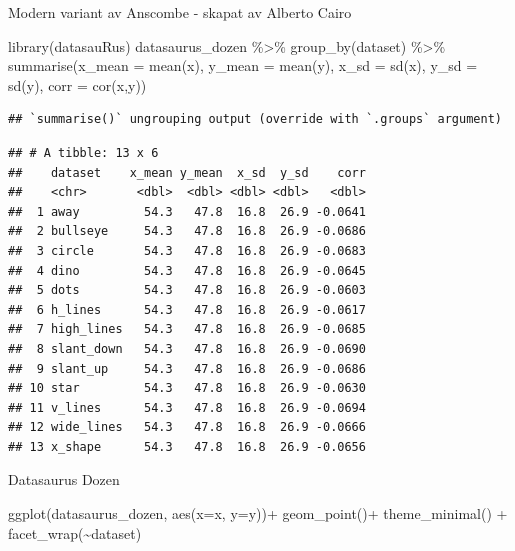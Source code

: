 \documentclass[
]{book}
\newenvironment{Shaded}{\begin{snugshade}}{\end{snugshade}}
\newcommand{\AttributeTok}[1]{\textcolor[rgb]{0.77,0.63,0.00}{#1}}
\newcommand{\FunctionTok}[1]{\textcolor[rgb]{0.00,0.00,0.00}{#1}}
\newcommand{\NormalTok}[1]{#1}
\newcommand{\SpecialCharTok}[1]{\textcolor[rgb]{0.00,0.00,0.00}{#1}}
\begin{document}
Modern variant av Anscombe - skapat av Alberto Cairo

\begin{Shaded}
\begin{Highlighting}[]
\FunctionTok{library}\NormalTok{(datasauRus)}
\NormalTok{datasaurus\_dozen }\SpecialCharTok{\%\textgreater{}\%} 
  \FunctionTok{group\_by}\NormalTok{(dataset) }\SpecialCharTok{\%\textgreater{}\%}
  \FunctionTok{summarise}\NormalTok{(}\AttributeTok{x\_mean =} \FunctionTok{mean}\NormalTok{(x), }\AttributeTok{y\_mean =} \FunctionTok{mean}\NormalTok{(y), }
            \AttributeTok{x\_sd =} \FunctionTok{sd}\NormalTok{(x), }\AttributeTok{y\_sd =} \FunctionTok{sd}\NormalTok{(y),}
            \AttributeTok{corr =} \FunctionTok{cor}\NormalTok{(x,y)) }
\end{Highlighting}
\end{Shaded}

\begin{verbatim}
## `summarise()` ungrouping output (override with `.groups` argument)
\end{verbatim}

\begin{verbatim}
## # A tibble: 13 x 6
##    dataset    x_mean y_mean  x_sd  y_sd    corr
##    <chr>       <dbl>  <dbl> <dbl> <dbl>   <dbl>
##  1 away         54.3   47.8  16.8  26.9 -0.0641
##  2 bullseye     54.3   47.8  16.8  26.9 -0.0686
##  3 circle       54.3   47.8  16.8  26.9 -0.0683
##  4 dino         54.3   47.8  16.8  26.9 -0.0645
##  5 dots         54.3   47.8  16.8  26.9 -0.0603
##  6 h_lines      54.3   47.8  16.8  26.9 -0.0617
##  7 high_lines   54.3   47.8  16.8  26.9 -0.0685
##  8 slant_down   54.3   47.8  16.8  26.9 -0.0690
##  9 slant_up     54.3   47.8  16.8  26.9 -0.0686
## 10 star         54.3   47.8  16.8  26.9 -0.0630
## 11 v_lines      54.3   47.8  16.8  26.9 -0.0694
## 12 wide_lines   54.3   47.8  16.8  26.9 -0.0666
## 13 x_shape      54.3   47.8  16.8  26.9 -0.0656
\end{verbatim}

Datasaurus Dozen

\begin{Shaded}
\begin{Highlighting}[]
\FunctionTok{ggplot}\NormalTok{(datasaurus\_dozen, }\FunctionTok{aes}\NormalTok{(}\AttributeTok{x=}\NormalTok{x, }\AttributeTok{y=}\NormalTok{y))}\SpecialCharTok{+}
  \FunctionTok{geom\_point}\NormalTok{()}\SpecialCharTok{+}
  \FunctionTok{theme\_minimal}\NormalTok{() }\SpecialCharTok{+}
  \FunctionTok{facet\_wrap}\NormalTok{(}\SpecialCharTok{\textasciitilde{}}\NormalTok{dataset)}
\end{Highlighting}
\end{Shaded}
\end{document}
